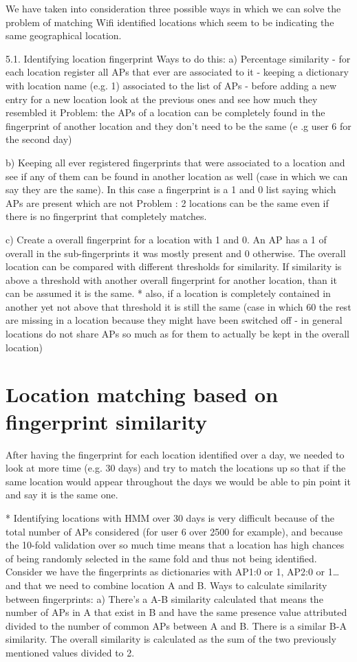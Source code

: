 We have taken into consideration three possible ways in which we can solve the
problem of matching Wifi identified locations which seem to be indicating the
same geographical location.

5.1. Identifying location fingerprint
Ways to do this:
a) Percentage similarity
- for each location register all APs that ever are associated to it
- keeping a dictionary with location name (e.g. 1) associated to the list of APs 
- before adding a new entry for a new location look at the previous ones and see how much they resembled it
Problem: the APs of a location can be completely found in the fingerprint of another location and they don’t need to be the same (e .g user 6 for the second day)

b) Keeping all ever registered fingerprints that were associated to a location
and see if any of them can be found in another location as well (case in which
we can say they are the same). In this case a fingerprint is a 1 and 0 list
saying which APs are present which are not Problem : 2 locations can be the same
even if there is no fingerprint that completely matches.

c) Create a overall fingerprint for a location with 1 and 0. An AP has a 1 of
overall in the sub-fingerprints it was mostly present and 0 otherwise. The
overall location can be compared with different thresholds for similarity. If
similarity is above a threshold with another overall fingerprint for another
location, than it can be assumed it is the same.
* also, if a location is completely contained in another yet not above that
threshold it is still the same (case in which 60%
the rest are missing in a location because they might have been switched off -
in general locations do not share APs so much as for them to actually be kept in
the overall location)

\section{Location matching based on fingerprint similarity}
After having the fingerprint for each location identified over a day, we needed to look at more time (e.g. 30 days) and try to match the locations up so that if the same location would appear throughout the days we would be able to pin point it and say it is the same one.

* Identifying locations with HMM over 30 days is very difficult because of the total number of APs considered (for user 6 over 2500 for example), and because the 10-fold validation over so much time means that a location has high chances of being randomly selected in the same fold and thus not being identified.
Consider we have the fingerprints as dictionaries with {AP1:0 or 1, AP2:0 or 1…} and that we need to combine location A and B.
Ways to calculate similarity between fingerprints:
a) There's a A-B similarity calculated that means the number of APs in A that exist in B and have the same presence value attributed divided to the number of common APs between A and B. There is a similar B-A similarity. The overall similarity is calculated as the sum of the two previously mentioned values divided to 2.

